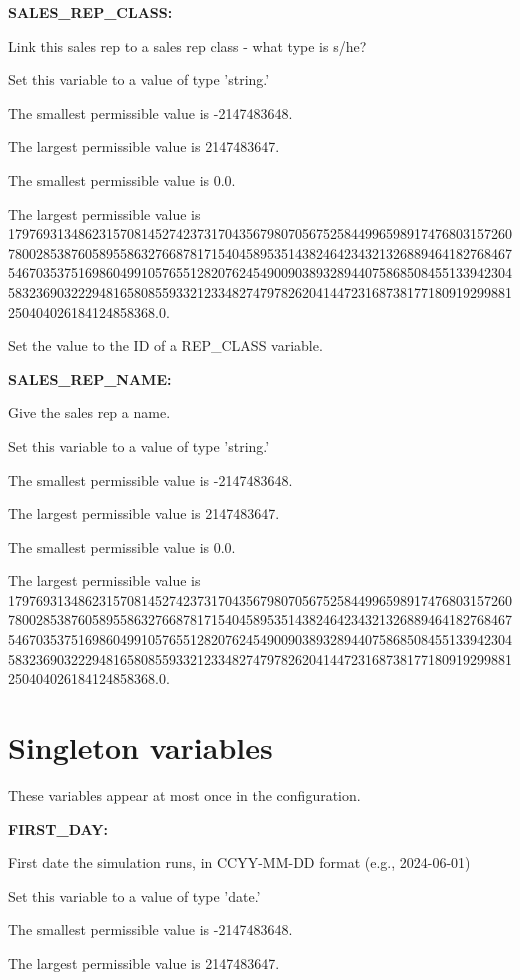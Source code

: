 \textbf{SALES\_REP\_CLASS:}


Link this sales rep to a sales rep class - what type is s/he?

Set this variable to a value of type 'string.'

The smallest permissible value is -2147483648.

The largest permissible value is 2147483647.

The smallest permissible value is 0.0.

The largest permissible value is 179769313486231570814527423731704356798070567525844996598917476803157260780028538760589558632766878171540458953514382464234321326889464182768467546703537516986049910576551282076245490090389328944075868508455133942304583236903222948165808559332123348274797826204144723168738177180919299881250404026184124858368.0.

Set the value to the ID of a REP\_CLASS variable.


\textbf{SALES\_REP\_NAME:}


Give the sales rep a name.

Set this variable to a value of type 'string.'

The smallest permissible value is -2147483648.

The largest permissible value is 2147483647.

The smallest permissible value is 0.0.

The largest permissible value is 179769313486231570814527423731704356798070567525844996598917476803157260780028538760589558632766878171540458953514382464234321326889464182768467546703537516986049910576551282076245490090389328944075868508455133942304583236903222948165808559332123348274797826204144723168738177180919299881250404026184124858368.0.


\section{Singleton variables}


These variables appear at most once in the configuration.


\textbf{FIRST\_DAY:}


First date the simulation runs, in CCYY-MM-DD format (e.g., 2024-06-01)

Set this variable to a value of type 'date.'

The smallest permissible value is -2147483648.

The largest permissible value is 2147483647.

